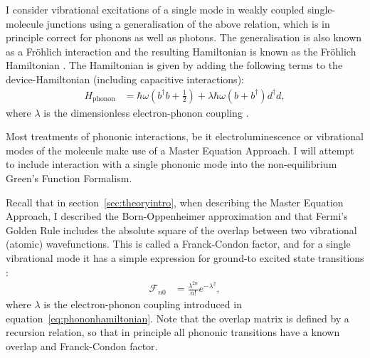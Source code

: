 I consider vibrational excitations of a single mode in weakly coupled single-molecule junctions using a generalisation of the above relation, which is in principle correct for phonons as well as photons. The generalisation is also known as a Fr\"ohlich interaction and the resulting Hamiltonian is known as the Fr\"ohlich Hamiltonian \cite{frohlich}. The Hamiltonian is given by adding the following terms to the device-Hamiltonian (including capacitive interactions):
\begin{align}
H_\text{phonon} &= \hbar \omega \left(b^\dagger b + \frac{1}{2}\right) + \lambda \hbar \omega (b + b^\dagger) d^\dagger d, \label{eq:phononhamiltonian}
\end{align}
where $\lambda$ is the dimensionless electron-phonon coupling \cite{kaspermothpoulsen}.

Most treatments of phononic interactions, be it electroluminescence \cite{electroluminescence} or vibrational modes of the molecule \cite{vibrationcomputation} make use of a Master Equation Approach. I will attempt to include interaction with a single phononic mode into the non-equilibrium Green's Function Formalism.

Recall that in section~\ref{sec:theoryintro}, when describing the Master Equation Approach, I described the Born-Oppenheimer approximation and that Fermi's Golden Rule includes the absolute square of the overlap between two vibrational (atomic) wavefunctions. This is called a Franck-Condon factor, and for a single vibrational mode it has a simple expression for ground-to excited state transitions \cite{kaspermothpoulsen}:
\begin{align}
\mathscr{F}_{n0} &= \frac{\lambda^{2n}}{n!} e^{-\lambda^2},
\label{eq:fcfactor}
\end{align}
where $\lambda$ is the electron-phonon coupling introduced in equation~\ref{eq:phononhamiltonian}.  Note that the overlap matrix is defined by a recursion relation, so that in principle all phononic transitions have a known overlap and Franck-Condon factor.

